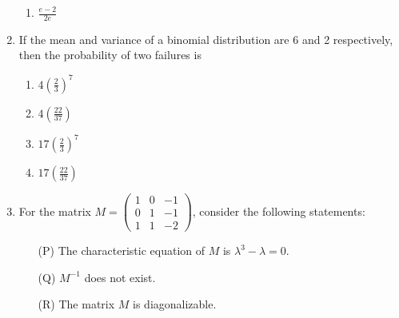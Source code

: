 \documentclass[journal]{IEEEtran}
\numberwithin{equation}{enumi}
\numberwithin{figure}{enumi}
\begin{document}
\begin{enumerate}
\begin{multicols}{4}
\begin{enumerate}
        \item \( \frac{e - 2}{2e} \)
    \end{enumerate}
    \end{multicols}
\bigskip
    \item If the mean and variance of a binomial distribution are 6 and 2 respectively, then the probability of two failures is
    \begin{multicols}{4}
    \begin{enumerate}
        \item \( 4 \left( \frac{2}{3} \right)^7 \)
        \item \( 4 \left( \frac{22}{37} \right) \)
        \item \( 17 \left( \frac{2}{3} \right)^7 \)
        \item \( 17 \left( \frac{22}{37} \right) \)
    \end{enumerate}
    \end{multicols}
\bigskip
    \item For the matrix \( M = \begin{pmatrix} 1 & 0 & -1 \\ 0 & 1 & -1 \\ 1 & 1 & -2 \end{pmatrix} \), consider the following statements:
    
    \begin{itemize}
        \item[(P)] The characteristic equation of \( M \) is \( \lambda^3 - \lambda = 0 \).
        \item[(Q)] \( M^{-1} \) does not exist.
        \item[(R)] The matrix \( M \) is diagonalizable.
    \end{itemize}


\end{enumerate}
\end{document}
